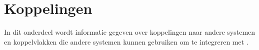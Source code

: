 \section{Koppelingen}
In dit onderdeel wordt informatie gegeven over koppelingen naar andere systemen en koppelvlakken die andere systemen kunnen gebruiken om te integreren met \customerdomain .








